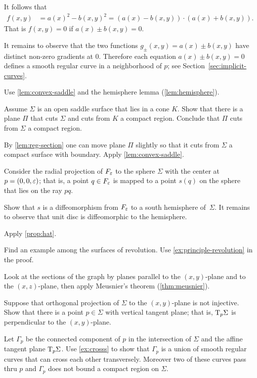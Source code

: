 It follows that 
\begin{align*}
f(x,y)&=a(x)^2-b(x,y)^2=
(a(x)-b(x,y))\cdot (a(x)+b(x,y)).
\end{align*}
That is $f(x,y)=0$ if $a(x)\pm b(x,y) =0$.

It remains to observe that the two functions $g_\pm(x,y)=a(x)\pm b(x,y)$ have distinct non-zero gradients at $0$.
Therefore each equation $a(x)\pm b(x,y) =0$ defines a smooth regular curve in a neighborhood of $p$;
see Section~\ref{sec:implicit-curves}.





 Use \ref{lem:convex-saddle} and the hemisphere lemma (\ref{lem:hemisphere}).

Assume $\Sigma$ is an open saddle surface that lies in a cone $K$.
Show that there is a plane $\Pi$ that cuts $\Sigma$ and cuts from $K$ a compact region.
Conclude that $\Pi$ cuts from $\Sigma$ a compact region.

By \ref{lem:reg-section} one can move plane $\Pi$ slightly so that it cuts from $\Sigma$ a compact surface with boundary.
Apply \ref{lem:convex-saddle}.


Consider the radial projection of $F_\varepsilon$ to the sphere $\Sigma$ with the center at $p=(0,0,\varepsilon)$;
that is, a point $q\in F_\varepsilon$ is mapped to a point $s(q)$ on the sphere that lies on the ray $pq$.

Show that $s$ is a diffeomorphism from $F_\varepsilon$ to a south hemisphere of~$\Sigma$.
It remains to observe that unit disc is diffeomorphic to the hemisphere.

 Apply \ref{prop:hat}.


Find an example among the surfaces of revolution.
Use \ref{ex:principle-revolution} in the proof.

 Look at the sections of the graph by planes parallel to the $(x,y)$-plane and to the $(x,z)$-plane, then apply Meusnier’s theorem (\ref{thm:meusnier}).

Suppose that orthogonal projection of $\Sigma$ to the $(x,y)$-plane is not injective.
Show that there is a point $p\in\Sigma$ with vertical tangent plane;
that is, $\mathrm{T}_p\Sigma$ is perpendicular to the $(x,y)$-plane.

Let $\Gamma_p$ be the connected component of $p$ in the intersection of $\Sigma$ and the affine tangent plane $\mathrm{T}_p\Sigma$.
Use \ref{ex:crosss} to show that $\Gamma_p$ is a union of smooth regular curves that can cross each other transversely.
Moreover two of these curves pass thru $p$ and $\Gamma_p$ does not bound a compact region on $\Sigma$.

